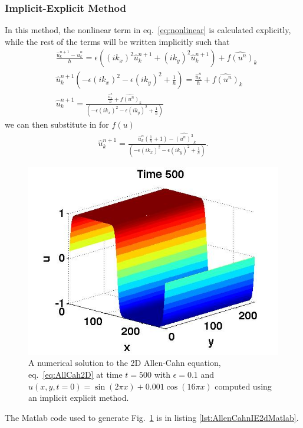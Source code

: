 \subsubsection{Implicit-Explicit Method}
In this method, the nonlinear term in eq.\ \eqref{eq:nonlinear} is calculated explicitly, while the rest of the terms will be written implicitly such that
\begin{align}
&{} \frac{\hat{u}_k^{n+1}-\hat{u}_k^n}{h} = \epsilon\left((ik_x)^2\hat{u}_k^{n+1}+(ik_y)^2\hat{u}_k^{n+1}\right)+\widehat{f(u^n)}_k 
\\&{} \hat{u}_k^{n+1}\left(-\epsilon(ik_x)^2-\epsilon(ik_y)^2+\frac{1}{h}\right)=\frac{\hat{u}_k^n}{h}+\widehat{f(u^n)}_k
\\&{} \hat{u}_k^{n+1} = \frac{\frac{\hat{u}_k^n}{h}+\widehat{f(u^n)}_k}{ \left(-\epsilon(ik_x)^2-\epsilon(ik_y)^2+\frac{1}{h}\right)}
\end{align}
we can then substitute in for $f(u)$
\begin{align}
\hat{u}_k^{n+1} = \frac{\hat{u}_k^n\left(\frac{1}{h}+1\right)-\widehat{(u^n)^3}_k}{ \left(-\epsilon(ik_x)^2-\epsilon(ik_y)^2+\frac{1}{h}\right)}. \label{eq:Allen_Cahn_IE_2D}
\end{align}
\begin{figure}
\begin{center}
\includegraphics[scale=.2]{./ExamplesInMatlab/Allen_Cahn_2D_IE}
\caption{A numerical solution to the 2D Allen-Cahn equation, eq.\ \eqref{eq:AllCah2D} at time $t=500$ with $\epsilon=0.1$ and $u(x,y,t=0)=\sin(2\pi x)+0.001\cos(16\pi x)$ computed using an implicit explicit method.} \label{fig:AllenCahnIE2dMatlab}
\end{center}
\end{figure}
The Matlab code used to generate Fig.\ \ref{fig:AllenCahnIE2dMatlab} is in listing \ref{lst:AllenCahnIE2dMatlab}.

